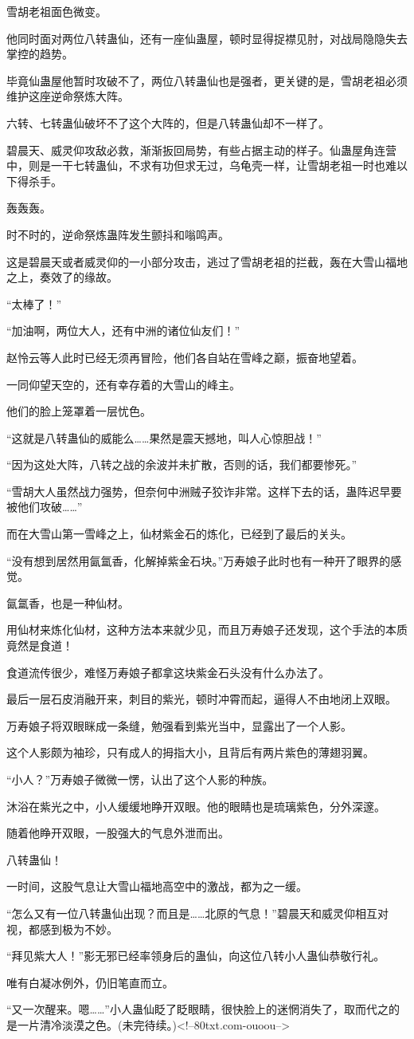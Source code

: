 \begin{this_body}
雪胡老祖面色微变。

他同时面对两位八转蛊仙，还有一座仙蛊屋，顿时显得捉襟见肘，对战局隐隐失去掌控的趋势。

毕竟仙蛊屋他暂时攻破不了，两位八转蛊仙也是强者，更关键的是，雪胡老祖必须维护这座逆命祭炼大阵。

六转、七转蛊仙破坏不了这个大阵的，但是八转蛊仙却不一样了。

碧晨天、威灵仰攻敌必救，渐渐扳回局势，有些占据主动的样子。仙蛊屋角连营中，则是一干七转蛊仙，不求有功但求无过，乌龟壳一样，让雪胡老祖一时也难以下得杀手。

轰轰轰。

时不时的，逆命祭炼蛊阵发生颤抖和嗡鸣声。

这是碧晨天或者威灵仰的一小部分攻击，逃过了雪胡老祖的拦截，轰在大雪山福地之上，奏效了的缘故。

“太棒了！”

“加油啊，两位大人，还有中洲的诸位仙友们！”

赵怜云等人此时已经无须再冒险，他们各自站在雪峰之巅，振奋地望着。

一同仰望天空的，还有幸存着的大雪山的峰主。

他们的脸上笼罩着一层忧色。

“这就是八转蛊仙的威能么……果然是震天撼地，叫人心惊胆战！”

“因为这处大阵，八转之战的余波并未扩散，否则的话，我们都要惨死。”

“雪胡大人虽然战力强势，但奈何中洲贼子狡诈非常。这样下去的话，蛊阵迟早要被他们攻破……”

而在大雪山第一雪峰之上，仙材紫金石的炼化，已经到了最后的关头。

“没有想到居然用氤氲香，化解掉紫金石块。”万寿娘子此时也有一种开了眼界的感觉。

氤氲香，也是一种仙材。

用仙材来炼化仙材，这种方法本来就少见，而且万寿娘子还发现，这个手法的本质竟然是食道！

食道流传很少，难怪万寿娘子都拿这块紫金石头没有什么办法了。

最后一层石皮消融开来，刺目的紫光，顿时冲霄而起，逼得人不由地闭上双眼。

万寿娘子将双眼眯成一条缝，勉强看到紫光当中，显露出了一个人影。

这个人影颇为袖珍，只有成人的拇指大小，且背后有两片紫色的薄翅羽翼。

“小人？”万寿娘子微微一愣，认出了这个人影的种族。

沐浴在紫光之中，小人缓缓地睁开双眼。他的眼睛也是琉璃紫色，分外深邃。

随着他睁开双眼，一股强大的气息外泄而出。

八转蛊仙！

一时间，这股气息让大雪山福地高空中的激战，都为之一缓。

“怎么又有一位八转蛊仙出现？而且是……北原的气息！”碧晨天和威灵仰相互对视，都感到极为不妙。

“拜见紫大人！”影无邪已经率领身后的蛊仙，向这位八转小人蛊仙恭敬行礼。

唯有白凝冰例外，仍旧笔直而立。

“又一次醒来。嗯……”小人蛊仙眨了眨眼睛，很快脸上的迷惘消失了，取而代之的是一片清冷淡漠之色。(未完待续。)<!--80txt.com-ouoou-->

\end{this_body}

